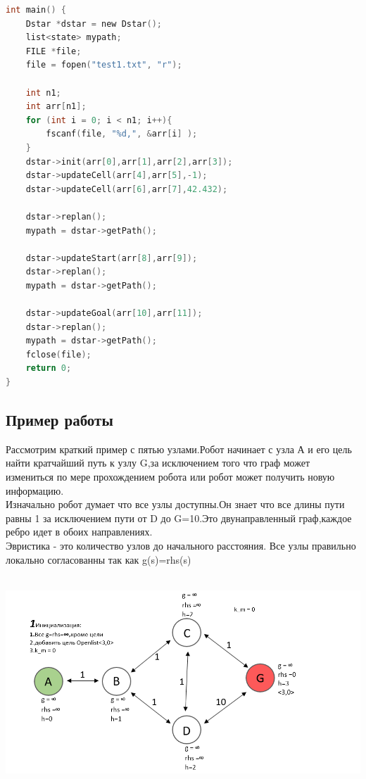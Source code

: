\documentclass[12pt]{article}
\begin{document}
\begin{lstlisting}[language=C,style=C]
int main() {
    Dstar *dstar = new Dstar();
    list<state> mypath;
    FILE *file;
    file = fopen("test1.txt", "r");

    int n1;
    int arr[n1];
    for (int i = 0; i < n1; i++){
        fscanf(file, "%d,", &arr[i] );
    }
    dstar->init(arr[0],arr[1],arr[2],arr[3]); 
    dstar->updateCell(arr[4],arr[5],-1);     
    dstar->updateCell(arr[6],arr[7],42.432); 

    dstar->replan();               
    mypath = dstar->getPath();     

    dstar->updateStart(arr[8],arr[9]);      
    dstar->replan();               
    mypath = dstar->getPath();    

    dstar->updateGoal(arr[10],arr[11]);        
    dstar->replan();               
    mypath = dstar->getPath();     
    fclose(file);
    return 0;
}
\end{lstlisting}
\begin{center}
   \section*{Пример работы}
\end{center}
Рассмотрим краткий пример с пятью узлами.Робот начинает с узла А и его цель найти кратчайший путь к узлу G,за исключением того что граф может измениться по мере прохождением робота или робот может получить новую информацию.\\
Изначально робот думает что все узлы доступны.Он знает что все длины пути равны 1 за исключением пути от D до G=10.Это двунаправленный граф,каждое ребро идет в обоих направлениях.\\
Эвристика - это количество узлов до начального расстояния.
Все узлы правильно локально согласованны так как g(s)=rhs(s)\\
\\
\begin{center}
        \includegraphics[width=1\textwidth]{img/example1.png}
    \end{center}
\end{document}
